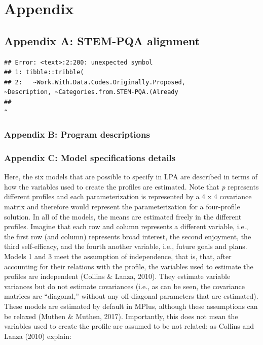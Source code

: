 \documentclass[]{msu-thesis}
\theoremstyle{definition}
\theoremstyle{definition}
\theoremstyle{definition}
\theoremstyle{remark}
\begin{document}
\chapter{Appendix}\label{appendix}

\section{Appendix A: STEM-PQA
alignment}\label{appendix-a-stem-pqa-alignment}

\begin{verbatim}
## Error: <text>:2:200: unexpected symbol
## 1: tibble::tribble(
## 2:   ~Work.With.Data.Codes.Originally.Proposed,                                                                                                    ~Description, ~Categories.from.STEM-PQA.(Already
##                                                                                                                                                                                                           ^
\end{verbatim}

\subsection{Appendix B: Program
descriptions}\label{appendix-b-program-descriptions}

\subsection{Appendix C: Model specifications
details}\label{appendix-c-model-specifications-details}

Here, the six models that are possible to specify in LPA are described
in terms of how the variables used to create the profiles are estimated.
Note that \emph{p} represents different profiles and each
parameterization is represented by a 4 x 4 covariance matrix and
therefore would represent the parameterization for a four-profile
solution. In all of the models, the means are estimated freely in the
different profiles. Imagine that each row and column represents a
different variable, i.e., the first row (and column) represents broad
interest, the second enjoyment, the third self-efficacy, and the fourth
another variable, i.e., future goals and plans. Models 1 and 3 meet the
assumption of independence, that is, that, after accounting for their
relations with the profile, the variables used to estimate the profiles
are independent (Collins \& Lanza, 2010). They estimate variable
variances but do not estimate covariances (i.e., as can be seen, the
covariance matrices are ``diagonal,'' without any off-diagonal
parameters that are estimated). These models are estimated by default in
MPlus, although these assumptions can be relaxed (Muthen \& Muthen,
2017). Importantly, this does not mean the variables used to create the
profile are assumed to be not related; as Collins and Lanza (2010)
explain:
\end{document}
